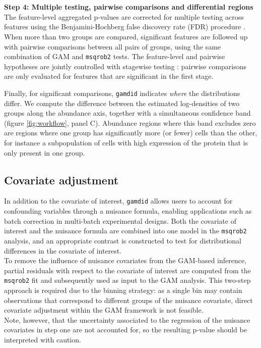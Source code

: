 \\
\\
\textbf{Step 4: Multiple testing, pairwise comparisons and differential regions}
The feature-level aggregated p-values are corrected for multiple testing across features using the Benjamini-Hochberg false discovery rate (FDR) procedure \cite{BH_procedure}. When more than two groups are compared, significant features are followed up with pairwise comparisons between all pairs of groups, using the same combination of GAM and \texttt{msqrob2} tests. The feature-level and pairwise hypotheses are jointly controlled with stagewise testing \cite{stagewise_testing, stager}: pairwise comparisons are only evaluated for features that are significant in the first stage.

Finally, for significant comparisons, \texttt{gamdid} indicates \emph{where} the distributions differ. We compute the difference between the estimated log-densities of two groups along the abundance axis, together with a simultaneous confidence band (figure \ref{fig:workflow}, panel C). Abundance regions where this band excludes zero are regions where one group has significantly more (or fewer) cells than the other, for instance a subpopulation of cells with high expression of the protein that is only present in one group.

\subsection{Covariate adjustment}
In addition to the covariate of interest, \texttt{gamdid} allows users to account for confounding variables through a nuisance formula, enabling applications such as batch correction in multi-batch experimental designs. Both the covariate of interest and the nuisance formula are combined into one model in the \texttt{msqrob2} analysis, and an appropriate contrast is constructed to test for distributional differences in the covariate of interest.\\ 
To remove the influence of nuisance covariates from the GAM-based inference, partial residuals with respect to the covariate of interest are computed from the \texttt{msqrob2} fit and subsequently used as input to the GAM analysis. This two-step approach is required due to the binning strategy: as a single bin may contain observations that correspond to different groups of the nuisance covariate, direct covariate adjustment within the GAM framework is not feasible.\\
Note, however, that the uncertainty associated to the regression of the nuisance covariates in step one are not accounted for, so the resulting p-value should be interpreted with caution. 

